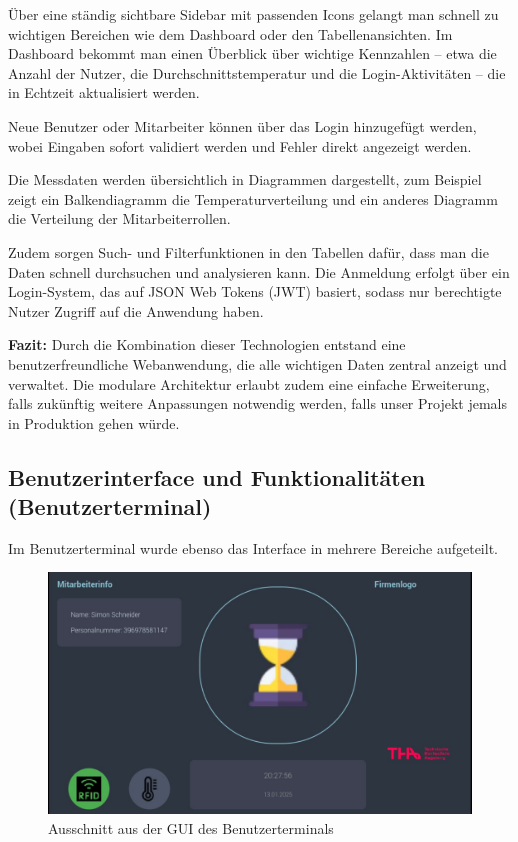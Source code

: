 Über eine ständig sichtbare Sidebar mit passenden Icons gelangt man schnell zu wichtigen Bereichen wie dem Dashboard oder den Tabellenansichten. Im Dashboard bekommt man einen Überblick über wichtige Kennzahlen – etwa die Anzahl der Nutzer, die Durchschnittstemperatur und die Login-Aktivitäten – die in Echtzeit aktualisiert werden. 

\vspace{1em}
\noindent Neue Benutzer oder Mitarbeiter können über das Login hinzugefügt werden, wobei Eingaben sofort validiert werden und Fehler direkt angezeigt werden. 

\vspace{1em}
\noindent Die Messdaten werden übersichtlich in Diagrammen dargestellt, zum Beispiel zeigt ein Balkendiagramm die Temperaturverteilung und ein anderes Diagramm die Verteilung der Mitarbeiterrollen.

\vspace{1em}
\noindent Zudem sorgen Such- und Filterfunktionen in den Tabellen dafür, dass man die Daten schnell durchsuchen und analysieren kann. Die Anmeldung erfolgt über ein Login-System, das auf JSON Web Tokens (JWT) basiert, sodass nur berechtigte Nutzer Zugriff auf die Anwendung haben.

\vspace{1em}
\noindent\textbf{Fazit:}\newline
Durch die Kombination dieser Technologien entstand eine benutzerfreundliche Webanwendung, die alle wichtigen Daten zentral anzeigt und verwaltet. Die modulare Architektur erlaubt zudem eine einfache Erweiterung, falls zukünftig weitere Anpassungen notwendig werden, falls unser Projekt jemals in Produktion gehen würde.

\subsection{Benutzerinterface und Funktionalitäten (Benutzerterminal)}

Im Benutzerterminal wurde ebenso das Interface in mehrere Bereiche aufgeteilt.

\begin{figure}[h]
	\centering
	\includegraphics[width=0.8\linewidth]{figures/GUI Benutzerterminal.jpg}
	\caption[GUI Benutzerterminal]{Ausschnitt aus der GUI des Benutzerterminals}\label{fig:gui_userterminal}
\end{figure}

